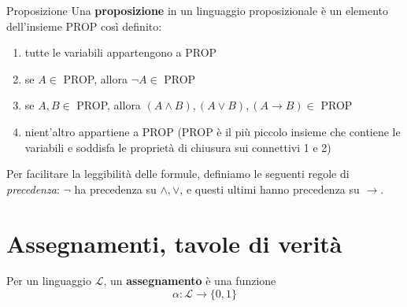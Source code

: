 \documentclass[a4paper,11pt]{report}
\begin{document}
\begin{defframe}{Proposizione}{}
    Una \textbf{proposizione} in un linguaggio proposizionale è un elemento dell'insieme PROP così definito:
    \begin{enumerate}
        \item tutte le variabili appartengono a PROP
        \item se \( A \in \) PROP, allora \( \neg A \in \) PROP
        \item se \( A, B \in \) PROP, allora \( (A \land B), (A \lor B), (A \to B) \in \) PROP
        \item nient'altro appartiene a PROP {\color{gray}(PROP è il più piccolo insieme che contiene le variabili e soddisfa le proprietà di chiusura sui connettivi 1 e 2)}
    \end{enumerate}
\end{defframe}

Per facilitare la leggibilità delle formule, definiamo le seguenti regole di \textit{precedenza}: \( \neg \) ha precedenza su \( \land, \lor \), e questi ultimi hanno precedenza su \( \to \).

\section{Assegnamenti, tavole di verità}

Per un linguaggio \( \mathcal{L} \), un \textbf{assegnamento} è una funzione 
\[
    \alpha : \mathcal{L} \to \{0, 1\}
\]
\end{document}
